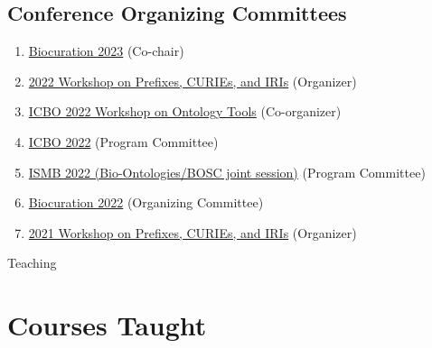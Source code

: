 \documentclass[10pt,a4paper,sans]{moderncv} %
\begin{document}
    \subsection{Conference Organizing Committees}
    \begin{enumerate}
        \item \href{https://bioregistry.io/wikidata:Q111430238?provider=scholia}{Biocuration 2023} (Co-chair)
        \item \href{https://biopragmatics.github.io/workshops/WPCI2022.html}{2022 Workshop on Prefixes, CURIEs, and IRIs} (Organizer)
        \item \href{https://icbo-conference.github.io/icbo2022/workshops-and-tutorials/#workshop-on-ontology-tools-and-workflows}{ICBO 2022 Workshop on Ontology Tools} (Co-organizer)
        \item \href{https://icbo-conference.github.io/icbo2022/program-committee}{ICBO 2022} (Program Committee)
        \item \href{https://www.iscb.org/ismb2022-program/abstracts/bio-ontologies}{ISMB 2022 (Bio-Ontologies/BOSC joint session)} (Program Committee)
        \item \href{https://bioregistry.io/wikidata:Q109407979?provider=scholia}{Biocuration 2022} (Organizing Committee)
        \item \href{https://biopragmatics.github.io/workshops/WPCI2021.html}{2021 Workshop on Prefixes, CURIEs, and IRIs} (Organizer)
    \end{enumerate}

\pagebreak
{\huge Teaching}

    \section{Courses Taught}
\end{document}
